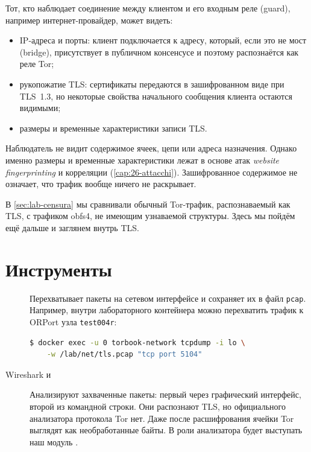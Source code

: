 Тот, кто наблюдает соединение между клиентом и его входным реле (guard), например интернет-провайдер, может видеть:
\begin{itemize}
  \item IP-адреса и порты: клиент подключается к адресу, который, если это не мост (bridge), присутствует в публичном консенсусе и поэтому распознаётся как реле Tor;
  \item рукопожатие TLS: сертификаты передаются в зашифрованном виде при TLS~1.3, но некоторые свойства начального сообщения клиента остаются видимыми;
  \item размеры и временные характеристики записи TLS.
\end{itemize}
Наблюдатель не видит содержимое ячеек, цепи или адреса назначения. Однако именно размеры и временные характеристики лежат в основе атак \emph{website fingerprinting} и корреляции (\cref{cap:26-attacchi}). Зашифрованное содержимое не означает, что трафик вообще ничего не раскрывает.

В \cref{sec:lab-censura} мы сравнивали обычный Tor-трафик, распознаваемый как TLS, с трафиком obfs4, не имеющим узнаваемой структуры. Здесь мы пойдём ещё дальше и заглянем внутрь TLS.

\section{Инструменты}\label{sec:traffico-strumenti}

\begin{description}
  \item[] Перехватывает пакеты на сетевом интерфейсе и сохраняет их в файл \texttt{pcap}. Например, внутри лабораторного контейнера можно перехватить трафик к ORPort узла \texttt{test004r}:
\begin{lstlisting}[language=bash,numbers=none]
$ docker exec -u 0 torbook-network tcpdump -i lo \
    -w /lab/net/tls.pcap "tcp port 5104"
\end{lstlisting}
  \item[Wireshark и ] Анализируют захваченные пакеты: первый через графический интерфейс, второй из командной строки. Они распознают TLS, но официального анализатора протокола Tor нет. Даже после расшифрования ячейки Tor выглядят как необработанные байты. В роли анализатора будет выступать наш модуль .
\end{description}

